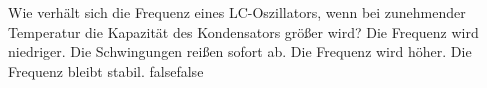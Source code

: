     {Wie verhält sich die Frequenz eines LC-Oszillators, wenn bei zunehmender Temperatur die Kapazität des Kondensators größer wird?}
    {Die Frequenz wird niedriger.}
    {Die Schwingungen reißen sofort ab.}
    {Die Frequenz wird höher.}
    {Die Frequenz bleibt stabil.}
    {false}{false}